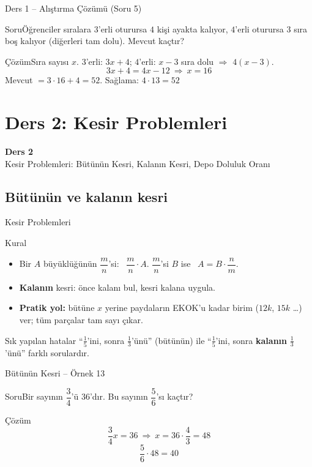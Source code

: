 \documentclass[aspectratio=169,11pt,handout]{beamer}
\newcommand{\soru}[3]{%
\begin{frame}{#1}
  \begin{block}{Soru}\large #2\end{block}
  \pause
  \begin{exampleblock}{Çözüm}\large #3\end{exampleblock}
\end{frame}}
\begin{document}
\soru{Ders 1 -- Alıştırma Çözümü (Soru 5)}
{Öğrenciler sıralara \(3\)'erli oturursa \(4\) kişi ayakta kalıyor, \(4\)'erli oturursa \(3\) sıra boş kalıyor (diğerleri tam dolu). Mevcut kaçtır?}
{Sıra sayısı \(x\). \quad \(3\)'erli: \(3x+4\); \quad \(4\)'erli: \(x-3\) sıra dolu \(\Rightarrow\) \(4(x-3)\).
\[3x+4=4x-12\ \Rightarrow\ x=16\]
Mevcut \(=3\cdot 16+4=52\). \quad Sağlama: \(4\cdot 13=52\) \checkmark}


\section{Ders 2: Kesir Problemleri}
\begin{frame}
\centering\Large\color{anamavi}\textbf{Ders 2}\\[6pt]\normalsize Kesir Problemleri: Bütünün Kesri, Kalanın Kesri, Depo Doluluk Oranı
\end{frame}

\subsection{Bütünün ve kalanın kesri}
\begin{frame}{Kesir Problemleri}
\begin{block}{Kural}
\begin{itemize}
\item Bir \(A\) büyüklüğünün \(\dfrac{m}{n}\)'si: \ \(\dfrac{m}{n}\cdot A\). \quad \(\dfrac{m}{n}\)'si \(B\) ise \ \(A=B\cdot\dfrac{n}{m}\).
\item \textbf{Kalanın} kesri: önce kalanı bul, kesri kalana uygula.
\item \textbf{Pratik yol:} bütüne \(x\) yerine paydaların EKOK'u kadar birim (\(12k\), \(15k\) \dots) ver; tüm parçalar tam sayı çıkar.
\end{itemize}
\end{block}
\begin{alertblock}{Sık yapılan hatalar}
``\(\frac{1}{5}\)'ini, sonra \(\frac{1}{3}\)'ünü'' (bütünün) ile ``\(\frac{1}{5}\)'ini, sonra \textbf{kalanın} \(\frac{1}{3}\)'ünü'' farklı sorulardır.
\end{alertblock}
\end{frame}

\soru{Bütünün Kesri -- Örnek 13}
{Bir sayının \(\dfrac{3}{4}\)'ü \(36\)'dır. Bu sayının \(\dfrac{5}{6}\)'sı kaçtır?}
{\[\frac{3}{4}x=36\ \Rightarrow\ x=36\cdot\frac{4}{3}=48\]
\[\frac{5}{6}\cdot 48=40\]}
\end{document}
